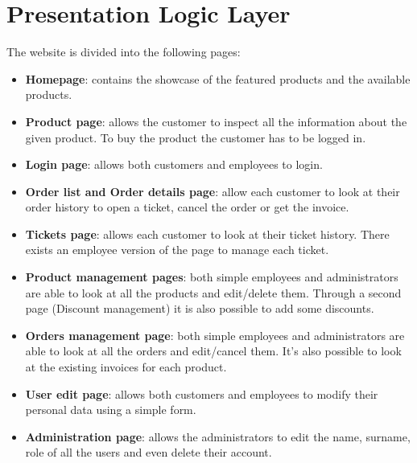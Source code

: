\section{Presentation Logic Layer}


The website is divided into the following pages:
\begin{itemize}
    \item \textbf{Homepage}: contains the showcase of the featured products and the available products.
    \item \textbf{Product page}: allows the customer to inspect all the information about the given product. To buy the product the customer has to be logged in.
    \item \textbf{Login page}: allows both customers and employees to login. 
    \item \textbf{Order list and Order details page}: allow each customer to look at their order history to open a ticket, cancel the order or get the invoice.
    \item \textbf{Tickets page}: allows each customer to look at their ticket history. There exists an employee version of the page to manage each ticket.
    \item \textbf{Product management pages}: both simple employees and administrators are able to look at all the products and edit/delete them. Through a second page (Discount management) it is also possible to add some discounts.
    \item \textbf{Orders management page}: both simple employees and administrators are able to look at all the orders and edit/cancel them. It's also possible to look at the existing invoices for each product.
    \item \textbf{User edit page}: allows both customers and employees to modify their personal data using a simple form. 
    \item \textbf{Administration page}: allows the administrators to edit the name, surname, role of all the users and even delete their account.
\end{itemize}

